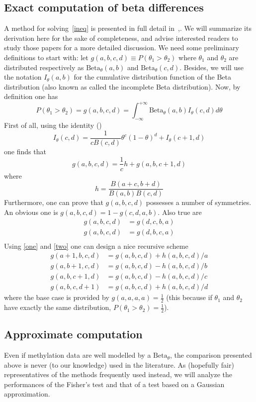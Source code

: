 \documentclass[11pt]{amsart}
\newcommand{\betapdf}{\mbox{Beta}_\theta}
\begin{document}
\subsection{Exact computation of beta differences}
A method for solving~\ref{ineq} is presented in full detail in~\cite{numineq},\cite{exactbetaineq}. We will summarize its derivation here for the sake of completeness, and advise interested readers to study those papers for a more detailed discussion. 
We need some preliminary definitions to start with:
let  $g(a,b,c,d) \equiv P(\theta_1>\theta_2)$ where $\theta_1$ and $\theta_2$ are distributed respectively as $\betapdf(a,b)$ and $\betapdf(c,d)$. Besides, we will use the notation $I_\theta(a,b)$ for the cumulative distribution function of the Beta distribution (also known as called the incomplete Beta distribution). Now, by definition one has \[P(\theta_1>\theta_2)=g(a,b,c,d)=\int_{-\infty}^{+\infty} \betapdf(a,b)I_\theta(c,d) d\theta\]
First of all,  using the identity (\cite{abramowitz}) 
\[I_\theta(c,d)=\frac{1}{cB(c,d)}\theta^c(1-\theta)^d+I_\theta(c+1,d)\] one finds that 
\begin{equation}
\label{one}
g(a,b,c,d)=\frac{1}{c}h+g(a,b,c+1,d)
\end{equation}
where \[h=\frac{B(a+c,b+d)}{B(a,b)B(c,d)}\]
Furthermore, one can prove that $g(a,b,c,d)$ possesses a number of symmetries.
An obvious one is $g(a,b,c,d)=1-g(c,d,a,b)$. Also true are 
\begin{equation}
\label{two}
\begin{aligned}
g(a,b,c,d)&=g(d,c,b,a) \\
g(a,b,c,d)&=g(d,b,c,a) \\
\end{aligned}
\end{equation}
Using \ref{one} and \ref{two} one can design a nice recursive scheme
\begin{align*}
g(a+1,b,c,d) &= g(a,b,c,d) + h(a,b,c,d)/a \\
g(a,b+1,c,d) &= g(a,b,c,d) - h(a,b,c,d)/b \\
g(a,b,c+1,d) &= g(a,b,c,d) - h(a,b,c,d)/c \\
g(a,b,c,d+1) &= g(a,b,c,d) + h(a,b,c,d)/d 
\end{align*}
where the base case is provided by $g(a,a,a,a)=\frac{1}{2}$ (this because if $\theta_1$ and $\theta_2$ have exactly the same distribution, $P(\theta_1>\theta_2)=\frac{1}{2}$).
\subsection{Approximate computation}
Even if methylation data are well modelled by a $\betapdf$, the comparison presented above is never (to our knowledge) used in the literature. As (hopefully fair) representatives of the methods frequently used instead, we will analyze the performances of the Fisher's test and that of a test based on a Gaussian approximation.
\end{document}
